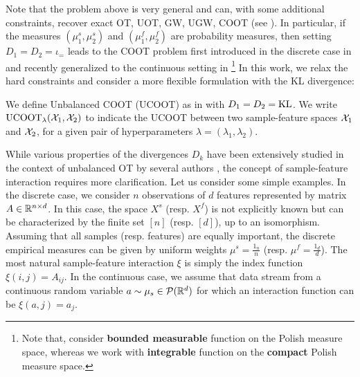 Note that the problem above is very general and can, with some additional
constraints, recover exact OT, UOT, GW, UGW, COOT (see ).
In particular, if the measures $(\mu^s_1, \mu^s_2)$ and $(\mu^f_1, \mu^f_2)$
are probability measures, then setting $D_1 = D_2 = \iota_=$ leads to the
COOT problem first introduced in the discrete case in \citep{Redko20} and
recently generalized to the continuous setting in \citep{Chowdhury21b}
\footnote{Note that, \citet{Chowdhury21b} consider \textbf{bounded measurable} function
on the Polish measure space, whereas we work with \textbf{integrable} function
on the \textbf{compact} Polish measure space.}
In this work, we relax the hard constraints and consider a more flexible formulation
with the KL divergence:
\begin{definition}[UCOOT]
   We define Unbalanced COOT (UCOOT) as in  with $D_1 = D_2 = \text{KL}$.
   We write $\text{UCOOT}_{\lambda}(\mathcal X_1, \mathcal X_2)$ to indicate the UCOOT between
   two sample-feature spaces $\mathcal X_1$ and $\mathcal X_2$, for a given
   pair of hyperparameters $\lambda = (\lambda_1, \lambda_2)$.
\end{definition}
While various properties of the divergences $D_k$ have been extensively studied
in the context of unbalanced OT by several authors \citep{Chizat17,Frogner15},
the concept of sample-feature interaction requires more clarification.
Let us consider some simple examples.
In the discrete case, we consider $n$ observations of $d$ features
represented by matrix $A \in \mathbb R^{n \times d}$. In this case, the space $X^s$ (resp. $X^f$)
is not explicitly known but can be characterized by the finite set $[n]$ (resp. $[d]$),
up to an isomorphism. Assuming that all samples (resp. features) are equally important,
the discrete empirical measures can be given by uniform weights $\mu^s = \frac{1_{n}}{n}$
(resp. $\mu^f = \frac{1_{d}}{d}$). The most natural sample-feature interaction $\xi$ is simply
the index function $\xi(i, j) = A_{ij}$. In the continuous case,
we assume that data stream from a continuous random variable $a \sim \mu_s \in \mathcal P(\mathbb R^d)$
for which an interaction function can be $\xi(a, j) = a_j$.

